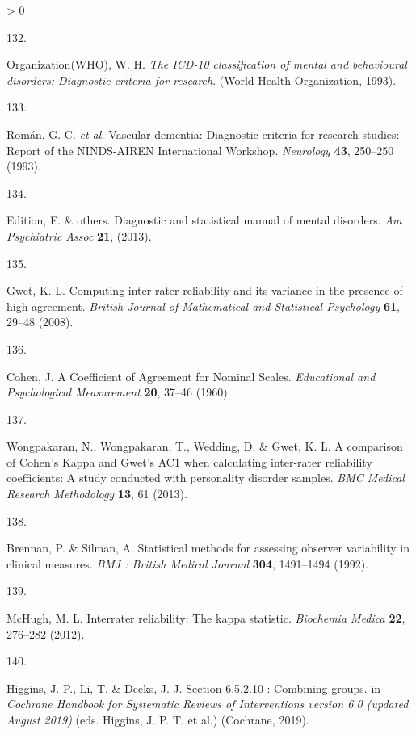 \documentclass[a4paper, twoside]{templates/ociamthesis}
\newlength{\cslhangindent}
\newlength{\csllabelwidth}
\newenvironment{CSLReferences}[3] %
 {%
  \setlength{\parindent}{0pt}
  \ifodd #1 \everypar{\setlength{\hangindent}{\cslhangindent}}\ignorespaces\fi
  \ifnum #2 > 0
  \setlength{\parskip}{#2\baselineskip}
  \fi
 }%
 {}
\newcommand{\CSLLeftMargin}[1]{\parbox[t]{\maxof{\widthof{#1}}{\csllabelwidth}}{#1}}
\newcommand{\CSLRightInline}[1]{\parbox[t]{\linewidth - \csllabelwidth}{#1}}
\begin{document}
\begin{CSLReferences}{0}{0}
\leavevmode\hypertarget{ref-organizationwho1993}{}%
\CSLLeftMargin{132. }
\CSLRightInline{Organization(WHO), W. H. \emph{The {ICD}-10 classification of mental and behavioural disorders: Diagnostic criteria for research}. ({World Health Organization}, 1993).}

\leavevmode\hypertarget{ref-roman1993}{}%
\CSLLeftMargin{133. }
\CSLRightInline{Román, G. C. \emph{et al.} Vascular dementia: Diagnostic criteria for research studies: Report of the {NINDS}-{AIREN International Workshop}. \emph{Neurology} \textbf{43}, 250--250 (1993).}

\leavevmode\hypertarget{ref-edition2013}{}%
\CSLLeftMargin{134. }
\CSLRightInline{Edition, F. \& others. Diagnostic and statistical manual of mental disorders. \emph{Am Psychiatric Assoc} \textbf{21}, (2013).}

\leavevmode\hypertarget{ref-gwet2008}{}%
\CSLLeftMargin{135. }
\CSLRightInline{Gwet, K. L. Computing inter-rater reliability and its variance in the presence of high agreement. \emph{British Journal of Mathematical and Statistical Psychology} \textbf{61}, 29--48 (2008).}

\leavevmode\hypertarget{ref-cohen1960}{}%
\CSLLeftMargin{136. }
\CSLRightInline{Cohen, J. A {Coefficient} of {Agreement} for {Nominal Scales}. \emph{Educational and Psychological Measurement} \textbf{20}, 37--46 (1960).}

\leavevmode\hypertarget{ref-wongpakaran2013}{}%
\CSLLeftMargin{137. }
\CSLRightInline{Wongpakaran, N., Wongpakaran, T., Wedding, D. \& Gwet, K. L. A comparison of {Cohen}'s {Kappa} and {Gwet}'s {AC1} when calculating inter-rater reliability coefficients: A study conducted with personality disorder samples. \emph{BMC Medical Research Methodology} \textbf{13}, 61 (2013).}

\leavevmode\hypertarget{ref-brennan1992}{}%
\CSLLeftMargin{138. }
\CSLRightInline{Brennan, P. \& Silman, A. Statistical methods for assessing observer variability in clinical measures. \emph{BMJ : British Medical Journal} \textbf{304}, 1491--1494 (1992).}

\leavevmode\hypertarget{ref-mchugh2012}{}%
\CSLLeftMargin{139. }
\CSLRightInline{McHugh, M. L. Interrater reliability: The kappa statistic. \emph{Biochemia Medica} \textbf{22}, 276--282 (2012).}

\leavevmode\hypertarget{ref-higgins2019}{}%
\CSLLeftMargin{140. }
\CSLRightInline{Higgins, J. P., Li, T. \& Deeks, J. J. Section 6.5.2.10 : Combining groups. in \emph{Cochrane {Handbook} for {Systematic Reviews} of {Interventions} version 6.0 (updated {August} 2019)} (eds. Higgins, J. P. T. et al.) ({Cochrane}, 2019).}


\end{CSLReferences}
\end{document}
